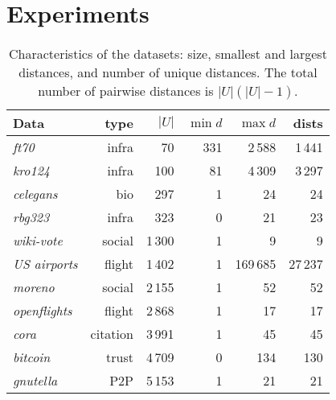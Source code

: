 
\section{Experiments}
\label{sec:exps}


\begin{table}[t]
  \caption{Characteristics of the datasets: size, smallest and largest distances, and number of unique distances. The total number of pairwise distances is $|U|(|U|-1)$.}
  \label{tab:datasets}
  \begin{tabular}{@{}lrrrrr@{}}
    \toprule
    Data  & type & $|U|$ & $\min d$ & $\max d$ & dists \\
    \midrule
    \emph{ft70} \cite{tsplib}  & infra & 70 & 331 & 2\,588 & 1\,441 \\
    \emph{kro124} \cite{tsplib} & infra & 100 & 81 & 4\,309 & 3\,297 \\
    \emph{celegans} \cite{kunegis2013konect} & bio & 297 & 1 & 24 & 24 \\
    \emph{rbg323} \cite{tsplib} & infra & 323 & 0 & 21 & 23 \\
    \emph{wiki-vote} \cite{snapnets} & social & 1\,300 & 1 & 9 & 9 \\
    \emph{US airports} \cite{toreopsal,kunegis2013konect} & flight & 1\,402 & 1 & 169\,685 & 27\,237 \\
    \emph{moreno} \cite{moody2001peer,kunegis2013konect} & social & 2\,155 & 1 & 52 & 52 \\
    \emph{openflights} \cite{toreopsal,kunegis2013konect} & flight & 2\,868 & 1 & 17 & 17 \\
    \emph{cora} \cite{vsubelj2013model,kunegis2013konect} & citation & 3\,991 & 1 & 45 & 45 \\
    \emph{bitcoin} \cite{kumar2016edge,kumar2018rev2} & trust & 4\,709 & 0 & 134 & 130 \\
    \emph{gnutella} \cite{snapnets} & P2P & 5\,153 & 1 & 21 & 21 \\
  \bottomrule
\end{tabular}
\end{table}


